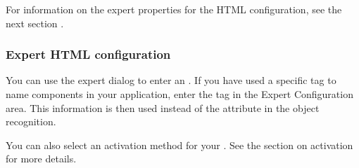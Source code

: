 For information on the expert properties for the HTML \gdaut{} configuration, see the next section . 

\subsubsection{Expert HTML \gdaut{} configuration}
\label{ExpertAUTConfigHTML}

You can use the expert dialog to enter an  . If you have used a specific tag to name components in your application, enter the tag in the Expert Configuration area. This information is then used instead of the  attribute in the object recognition. 

You can also select an activation method for your \gdaut{}. See the section on \gdaut{} activation  for more details. 




